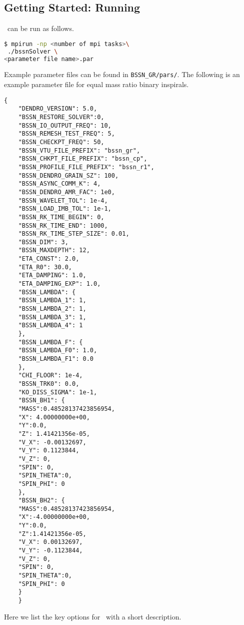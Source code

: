 \subsection{Getting Started: Running \bsolver}

\bsolver\  can be run as follows. 
\begin{lstlisting}[language=bash]
$ mpirun -np <number of mpi tasks>\
 ./bssnSolver \
<parameter file name>.par
\end{lstlisting}
Example parameter files can be found in \texttt{BSSN\_GR/pars/}. The following 
is an example parameter file for equal mass ratio binary inspirals. 
\begin{lstlisting}[basicstyle=\tiny]
	{
	"DENDRO_VERSION": 5.0,
	"BSSN_RESTORE_SOLVER":0,
	"BSSN_IO_OUTPUT_FREQ": 10,
	"BSSN_REMESH_TEST_FREQ": 5,
	"BSSN_CHECKPT_FREQ": 50,
	"BSSN_VTU_FILE_PREFIX": "bssn_gr",
	"BSSN_CHKPT_FILE_PREFIX": "bssn_cp",
	"BSSN_PROFILE_FILE_PREFIX": "bssn_r1",
	"BSSN_DENDRO_GRAIN_SZ": 100,
	"BSSN_ASYNC_COMM_K": 4,
	"BSSN_DENDRO_AMR_FAC": 1e0,
	"BSSN_WAVELET_TOL": 1e-4,
	"BSSN_LOAD_IMB_TOL": 1e-1,
	"BSSN_RK_TIME_BEGIN": 0,
	"BSSN_RK_TIME_END": 1000,
	"BSSN_RK_TIME_STEP_SIZE": 0.01,
	"BSSN_DIM": 3,
	"BSSN_MAXDEPTH": 12,
	"ETA_CONST": 2.0,
	"ETA_R0": 30.0,
	"ETA_DAMPING": 1.0,
	"ETA_DAMPING_EXP": 1.0,
	"BSSN_LAMBDA": {
	"BSSN_LAMBDA_1": 1,
	"BSSN_LAMBDA_2": 1,
	"BSSN_LAMBDA_3": 1,
	"BSSN_LAMBDA_4": 1
	},
	"BSSN_LAMBDA_F": {
	"BSSN_LAMBDA_F0": 1.0,
	"BSSN_LAMBDA_F1": 0.0
	},
	"CHI_FLOOR": 1e-4,
	"BSSN_TRK0": 0.0,
	"KO_DISS_SIGMA": 1e-1,
	"BSSN_BH1": {
	"MASS":0.48528137423856954,
	"X": 4.00000000e+00,
	"Y":0.0,
	"Z": 1.41421356e-05,
	"V_X": -0.00132697,
	"V_Y": 0.1123844,
	"V_Z": 0,
	"SPIN": 0,
	"SPIN_THETA":0,
	"SPIN_PHI": 0
	},
	"BSSN_BH2": {
	"MASS":0.48528137423856954,
	"X":-4.00000000e+00,
	"Y":0.0,
	"Z":1.41421356e-05,
	"V_X": 0.00132697,
	"V_Y": -0.1123844,
	"V_Z": 0,
	"SPIN": 0,
	"SPIN_THETA":0,
	"SPIN_PHI": 0
	}
	}
\end{lstlisting}
Here we list the key options for \bsolver\ with a short description.
